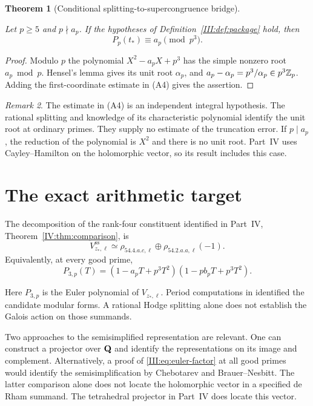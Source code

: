 \documentclass[11pt,letterpaper]{article}
\newtheorem{theorem}{Theorem}[section]
\theoremstyle{definition}
\theoremstyle{remark}
\newtheorem{remark}[theorem]{Remark}
\begin{document}
\begin{theorem}[Conditional splitting-to-supercongruence bridge]\label{III:thm:conditional}

Let $p\ge5$ and $p\nmid a_p$. If the hypotheses of
Definition~\ref{III:def:package} hold, then
\[
 P_p(t_*)\equiv a_p\pmod{p^3}.
\]
\end{theorem}

\begin{proof}
Modulo $p$ the polynomial $X^2-a_p X+p^3$ has the simple nonzero
root $a_p\bmod p$. Hensel's lemma gives its unit root $\alpha_p$,
and $a_p-\alpha_p=p^3/\alpha_p\in p^3\mathbb Z_p$. Adding the
first-coordinate estimate in (A4) gives the assertion.
\end{proof}

\begin{remark}
The estimate in (A4) is an independent integral hypothesis. The
rational splitting and knowledge of its characteristic polynomial
identify the unit root at ordinary primes. They supply no estimate of
the truncation error. If $p\mid a_p$, the reduction of the polynomial
is $X^2$ and there is no unit root. Part~IV uses Cayley--Hamilton on
the holomorphic vector, so its result includes this case.
\end{remark}

\section{The exact arithmetic target}

The decomposition of the rank-four constituent identified in Part~IV,
Theorem~\ref{IV:thm:comparison}, is
\begin{equation}\label{III:eq:global-split}
 V_{z_*,\ell}^{\mathrm{ss}}
 \simeq
 \rho_{54.4.a.c,\ell}\oplus\rho_{54.2.a.a,\ell}(-1).
\end{equation}
Equivalently, at every good prime,
\begin{equation}\label{III:eq:euler-factor}
 \boxed{
 P_{3,p}(T)=
 (1-a_pT+p^3T^2)(1-pb_pT+p^3T^2).
 }
\end{equation}

Here $P_{3,p}$ is the Euler polynomial of $V_{z_*,\ell}$. Period
computations in \cite{III:BKSZ} identified the candidate modular
forms. A rational Hodge splitting alone does not establish the
Galois action on those summands.

Two approaches to the semisimplified representation are relevant.
One can construct a projector over $\mathbf Q$ and identify the
representations on its image and complement. Alternatively,
a proof of \eqref{III:eq:euler-factor} at all good primes would
identify the semisimplification by Chebotarev and Brauer--Nesbitt.
The latter comparison alone does not locate the holomorphic vector
in a specified de Rham summand. The tetrahedral projector in
Part~IV does locate this vector.
\end{document}
